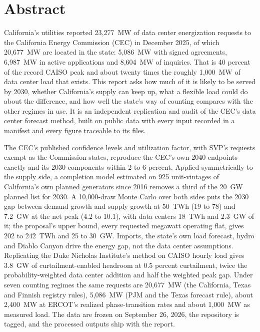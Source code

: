 \chapter*{Abstract}

California's utilities reported 23,277~MW of data center energization requests to the California Energy Commission (CEC) in December 2025, of which 20,677~MW are located in the state: 5,086~MW with signed agreements, 6,987~MW in active applications and 8,604~MW of inquiries. That is 40 percent of the record CAISO peak and about twenty times the roughly 1,000~MW of data center load that exists. This report asks how much of it is likely to be served by 2030, whether California's supply can keep up, what a flexible load could do about the difference, and how well the state's way of counting compares with the other regimes in use. It is an independent replication and audit of the CEC's data center forecast method, built on public data with every input recorded in a manifest and every figure traceable to its files.

The CEC's published confidence levels and utilization factor, with SVP's requests exempt as the Commission states, reproduce the CEC's own 2040 endpoints exactly and its 2030 components within 2 to 6 percent. Applied symmetrically to the supply side, a completion model estimated on 925 unit-vintages of California's own planned generators since 2016 removes a third of the 20~GW planned list for 2030. A 10,000-draw Monte Carlo over both sides puts the 2030 gap between demand growth and supply growth at 50~TWh (19 to 78) and 7.2~GW at the net peak (4.2 to 10.1), with data centers 18~TWh and 2.3~GW of it; the proposal's upper bound, every requested megawatt operating flat, gives 202 to 242~TWh and 25 to 30~GW. Imports, the state's own load forecast, hydro and Diablo Canyon drive the energy gap, not the data center assumptions. Replicating the Duke Nicholas Institute's method on CAISO hourly load gives 3.8~GW of curtailment-enabled headroom at 0.5 percent curtailment, twice the probability-weighted data center addition and half the weighted peak gap. Under seven counting regimes the same requests are 20,677~MW (the California, Texas and Finnish registry rules), 5,086~MW (PJM and the Texas forecast rule), about 2,400~MW at ERCOT's realized phase-transition rates and about 1,000~MW as measured load. The data are frozen on September 26, 2026, the repository is tagged, and the processed outputs ship with the report.
